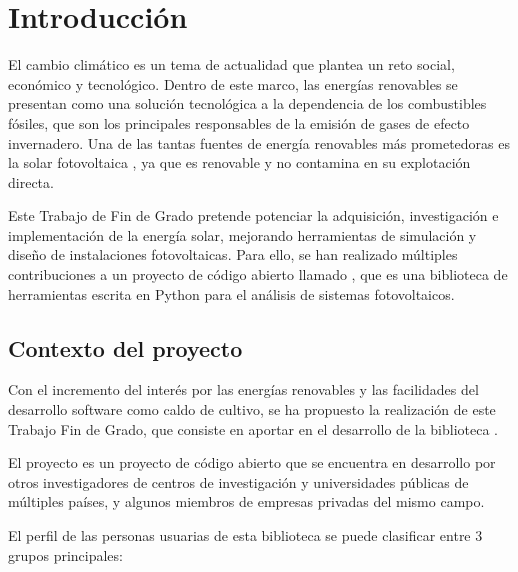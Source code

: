 \chapter{Introducción} \label{chp:intro}

El cambio climático es un tema de actualidad que plantea un reto social, económico y tecnológico. Dentro de este marco, las energías renovables se presentan como una solución tecnológica a la dependencia de los combustibles fósiles, que son los principales responsables de la emisión de gases de efecto invernadero. Una de las tantas fuentes de energía renovables más prometedoras es la solar \gls{fotovoltaica} \cite{Breyer_Bogdanov_Gulagi_Aghahosseini_Barbosa_Koskinen_Barasa_Caldera_Afanasyeva_Child_et_al_2017}, ya que es renovable y no contamina en su explotación directa.

Este Trabajo de Fin de Grado pretende potenciar la adquisición, investigación e implementación de la energía solar, mejorando herramientas de \gls{simulación} y diseño de instalaciones fotovoltaicas. Para ello, se han realizado múltiples contribuciones a un proyecto de código abierto llamado \pvlibpy{} \cite{Anderson_Hansen_Holmgren_Jensen_Mikofski_Driesse_2023, Stein_2012, Andrews_Stein_Hansen_Riley_2014, Holmgren_Andrews_Lorenzo_Stein_2015, Holmgren_Groenendyk_2016}, que es una biblioteca de herramientas escrita en \gls{Python} para el análisis de sistemas fotovoltaicos.


\section{Contexto del proyecto} \label{sct:intro:contexto}

Con el incremento del interés por las energías renovables y las facilidades del desarrollo \gls{software} como caldo de cultivo, se ha propuesto la realización de este Trabajo Fin de Grado, que consiste en aportar en el desarrollo de la biblioteca \pvlibpy{}.

El proyecto \pvlibpy{} es un proyecto de código abierto que se encuentra en desarrollo por otros investigadores de centros de investigación y universidades públicas de múltiples países, y algunos miembros de empresas privadas del mismo campo.

El perfil de las personas usuarias de esta biblioteca se puede clasificar entre 3 grupos principales:

